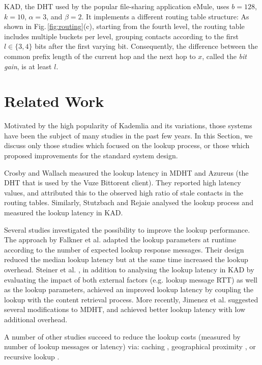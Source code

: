 \documentclass[10pt, conference, compsocconf, letterpaper]{IEEEtran}
\begin{document}
KAD, the DHT used by the popular file-sharing application eMule, uses  $b=128$, $k=10$, $\alpha=3$, and $\beta=2$. It implements a different routing table structure: As shown in Fig.\,\ref{fig:routing}(c), starting from the fourth level, the routing table includes multiple buckets per level, grouping contacts according to the first $l \in \{3,4\}$ bits after the first varying bit. Consequently, the difference between the common prefix length of the current hop and the next hop to $x$, called the \emph{bit gain}, is at least $l$.



\section{Related Work} \label{sec:related}

Motivated by the high popularity of Kademlia and its variations, those systems have been the subject of many studies in the past few years. In this Section, we discuss only those studies which focused on the lookup process, or those which proposed improvements for the standard system design.

Crosby and Wallach \cite{crosby07analysis} measured the lookup latency in MDHT and Azureus (the DHT that is used by the Vuze Bittorent client). They reported high latency values, and attributed this to the observed high ratio of stale contacts in the routing tables. 
Similarly, Stutzbach and Rejaie \cite{stutzbach06improving} analysed the lookup process and measured the lookup latency in KAD. 

Several studies investigated the possibility to improve the lookup performance. The approach by Falkner et al. \cite{falkner07profiling} adapted the lookup parameters at runtime according to the number of expected lookup response messages. Their design reduced the median lookup latency but at the same time increased the lookup overhead. Steiner et al. \cite{steiner10evaluating}, in addition to analysing the lookup latency in KAD by evaluating the impact of both external factors (e.g. lookup message RTT) as well as the lookup parameters, achieved an improved lookup latency by coupling the lookup with the content retrieval process.  More recently, Jimenez et al. \cite{Jimenez2011subsecond} suggested several modifications to MDHT, and achieved better lookup latency with low additional overhead. 

A number of other studies succeed to reduce the lookup costs (measured by number of lookup messages or latency) via: caching \cite{einziger13kaleidoscope, wang06dicas}, geographical proximity \cite{kaune08embracing, castro02exploiting}, or recursive lookup \cite{heep10r}. 
\end{document}
